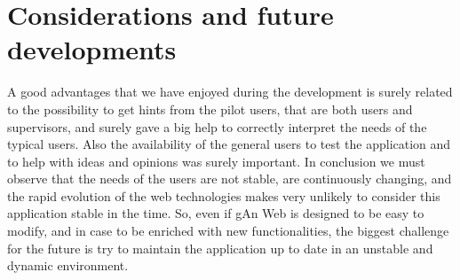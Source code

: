 \section{Considerations and future developments} 
A good advantages that we have enjoyed during the development is surely related to the possibility to get hints from the pilot users, that are both users and supervisors, and surely gave a big help to correctly interpret the needs of the typical users. Also the availability
of the general users to test the application and to help with ideas and opinions was surely important.
In conclusion we must observe that the needs of the users are not stable, are continuously changing, and the rapid evolution of the web technologies makes very unlikely to consider this application stable in the time. So, even if gAn Web is designed to be easy to modify, and in case to be enriched with new functionalities, the biggest challenge for the future is try to maintain the application up to date in an unstable and dynamic environment.